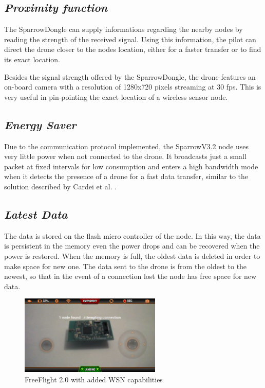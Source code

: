 \subsection{\textit{Proximity function}} 

\label{sec:prox}

The SparrowDongle can supply informations regarding the nearby nodes by reading the strength of the received signal. Using this information, the pilot can direct the drone closer to the nodes location, either for a faster transfer or to find its exact location\cite{yedavalli2005ecolocation}. 

Besides the signal strength offered by the SparrowDongle, the drone features an on-board camera with a resolution of 1280x720 pixels streaming at 30 fps. This is very useful in pin-pointing the exact location of a wireless sensor node.


\subsection{\textit{Energy Saver}} 

\label{sec:eng}

Due to the communication protocol implemented, the SparrowV3.2 node uses very little power when not connected to the drone. It broadcasts just a small packet at fixed intervals for low consumption and enters a high bandwidth mode when it detects the presence of a drone for a fast data transfer, similar to the solution described by Cardei et al.  \cite{cardei2005improving}.

\subsection{\textit{Latest Data}} 

\label{sec:data}

The data is stored on the flash micro controller of the node. In this way, the data is persistent in the memory even the power drops and can be recovered when the power is restored. When the memory is full, the oldest data is deleted in order to make space for new one. The data sent to the drone is from the oldest to the newest, so that in the event of a connection lost the node has free space for new data. 


\begin{figure}[ht] \centering
\includegraphics[width=0.6\textwidth]{img/app.png}
\caption{FreeFlight 2.0 with added WSN capabilities } \end{figure}
 



